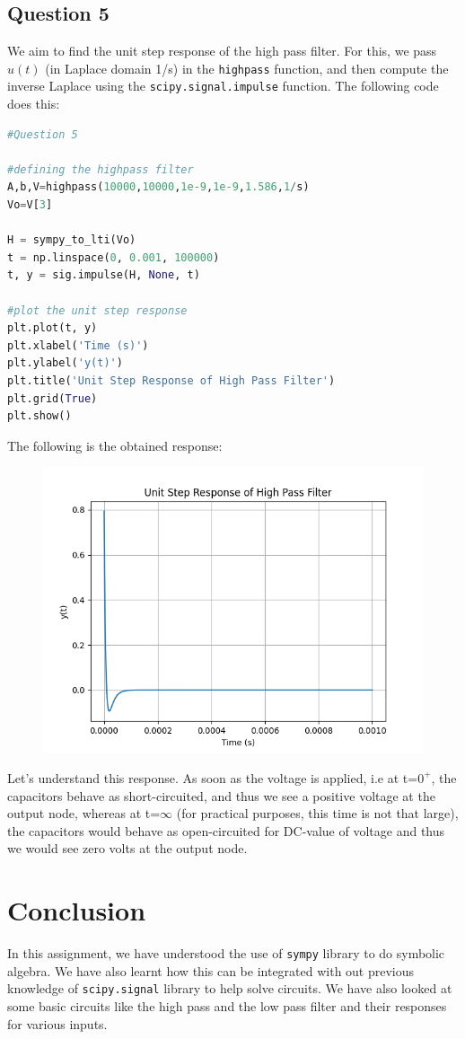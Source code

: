 \documentclass[11pt, a4paper]{article}
\begin{document}
\subsection{Question 5}
We aim to find the unit step response of the high pass filter. For this, we pass $u(t)$ (in Laplace domain 1/s) in the \texttt{highpass} function, and then compute the inverse Laplace using the \texttt{scipy.signal.impulse} function.
The following code does this:\\

\begin{lstlisting}[language = Python]
#Question 5

#defining the highpass filter 
A,b,V=highpass(10000,10000,1e-9,1e-9,1.586,1/s) 
Vo=V[3]

H = sympy_to_lti(Vo)
t = np.linspace(0, 0.001, 100000)
t, y = sig.impulse(H, None, t)

#plot the unit step response
plt.plot(t, y)
plt.xlabel('Time (s)')
plt.ylabel('y(t)')
plt.title('Unit Step Response of High Pass Filter')
plt.grid(True)
plt.show()

\end{lstlisting}

The following is the obtained response:
\begin{figure}[H]
     \centering
     \includegraphics[scale=0.8]{Figure_4.png}
\end{figure}

Let's understand this response. As soon as the voltage is applied, i.e at t=$0^+$, the capacitors behave as short-circuited, and thus we see a positive voltage at the output node, whereas at t=$\infty$ (for practical purposes, this time is not that large), the capacitors would behave as open-circuited for DC-value of voltage and thus we would see zero volts at the output node.

\section{Conclusion}
In this assignment, we have understood the use of \texttt{sympy} library to do symbolic algebra. We have also learnt how this can be integrated with out previous knowledge of \texttt{scipy.signal} library to help solve circuits. We have also looked at some basic circuits like the high pass and the low pass filter and their responses for various inputs. 
\end{document}
